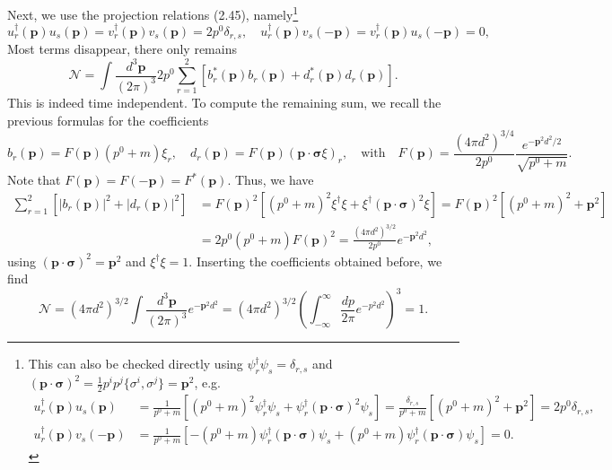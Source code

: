Next, we use the projection relations (2.45), namely\footnote{This can also be checked directly using $\psi_r^\dagger \psi_s = \delta_{r,s}$ and $(\mathbf{p}\cdot\boldsymbol{\sigma})^2 = \frac{1}{2}p^i p^j \{\sigma^i, \sigma^j\} = \mathbf{p}^2$, e.g.
\begin{equation}
\begin{aligned}
    u_r^\dagger(\mathbf{p})u_s(\mathbf{p}) &= \frac{1}{p^0+m} \left[ (p^0+m)^2\psi_r^\dagger\psi_s + \psi_r^\dagger(\mathbf{p}\cdot\boldsymbol{\sigma})^2\psi_s \right] = \frac{\delta_{r,s}}{p^0+m} \left[ (p^0+m)^2 + \mathbf{p}^2 \right] = 2p^0\delta_{r,s}, \\
    u_r^\dagger(\mathbf{p})v_s(-\mathbf{p}) &= \frac{1}{p^0+m} \left[ -(p^0+m)\psi_r^\dagger(\mathbf{p}\cdot\boldsymbol{\sigma})\psi_s + (p^0+m)\psi_r^\dagger(\mathbf{p}\cdot\boldsymbol{\sigma})\psi_s \right] = 0.
\end{aligned}
\end{equation}}
\begin{equation}
    u_r^\dagger(\mathbf{p})u_s(\mathbf{p}) = v_r^\dagger(\mathbf{p})v_s(\mathbf{p}) = 2p^0\delta_{r,s}, \quad u_r^\dagger(\mathbf{p})v_s(-\mathbf{p}) = v_r^\dagger(\mathbf{p})u_s(-\mathbf{p}) = 0,
\end{equation}
Most terms disappear, there only remains
\begin{equation}
    \mathcal{N} = \int \frac{d^3\mathbf{p}}{(2\pi)^3} 2p^0 \sum_{r=1}^2 \left[ b_r^*(\mathbf{p})b_r(\mathbf{p}) + d_r^*(\mathbf{p})d_r(\mathbf{p}) \right].
\end{equation}
This is indeed time independent. To compute the remaining sum, we recall the previous formulas for the coefficients
\begin{equation}
    b_r(\mathbf{p}) = F(\mathbf{p})(p^0+m)\xi_r, \quad d_r(\mathbf{p}) = F(\mathbf{p})(\mathbf{p}\cdot\boldsymbol{\sigma}\xi)_r, \quad \text{with} \quad F(\mathbf{p}) = \frac{(4\pi d^2)^{3/4}}{2p^0} \frac{e^{-\mathbf{p}^2d^2/2}}{\sqrt{p^0+m}}.
\end{equation}
Note that $F(\mathbf{p}) = F(-\mathbf{p}) = F^*(\mathbf{p})$. Thus, we have
\begin{equation}
\begin{aligned}
    \sum_{r=1}^2 \left[ |b_r(\mathbf{p})|^2 + |d_r(\mathbf{p})|^2 \right] &= F(\mathbf{p})^2 \left[ (p^0+m)^2\xi^\dagger\xi + \xi^\dagger(\mathbf{p}\cdot\boldsymbol{\sigma})^2\xi \right] = F(\mathbf{p})^2 \left[ (p^0+m)^2 + \mathbf{p}^2 \right] \\
    &= 2p^0(p^0+m)F(\mathbf{p})^2 = \frac{(4\pi d^2)^{3/2}}{2p^0} e^{-\mathbf{p}^2d^2},
\end{aligned}
\end{equation}
using $(\mathbf{p}\cdot\boldsymbol{\sigma})^2 = \mathbf{p}^2$ and $\xi^\dagger\xi = 1$. Inserting the coefficients obtained before, we find
\begin{equation}
    \mathcal{N} = (4\pi d^2)^{3/2} \int \frac{d^3\mathbf{p}}{(2\pi)^3} e^{-\mathbf{p}^2d^2} = (4\pi d^2)^{3/2} \left( \int_{-\infty}^\infty \frac{dp}{2\pi} e^{-p^2d^2} \right)^3 = 1.
\end{equation}

